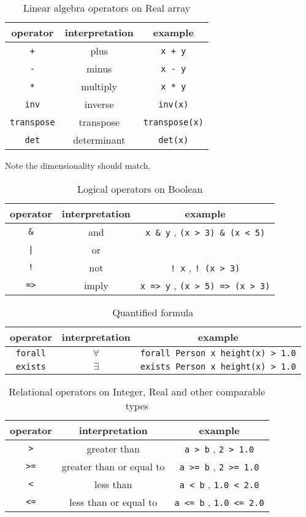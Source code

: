 \documentclass[12pt]{article}
\begin{document}
\begin{table}[H]
\centering
\caption{Linear algebra operators on Real array}
\begin{tabular}{ c c c }
\toprule 
operator & interpretation & example \\
\midrule
\verb|+| & plus & \verb|x + y| \\ 
\verb|-| & minus & \verb|x - y| \\ 
\verb|*| & multiply & \verb|x * y| \\
\verb|inv| & inverse & \verb|inv(x)| \\
\verb|transpose| & transpose & \verb|transpose(x)| \\
\verb|det| & determinant & \verb|det(x)| \\
\bottomrule
\end{tabular}

Note the dimensionality should match. 
\end{table}

\begin{table}[H]
\centering
\caption{Logical operators on Boolean}
\begin{tabular}{ c c c }
\toprule 
operator & interpretation & example \\
\midrule
\verb|&| & and & \verb|x & y| , \verb|(x > 3) & (x < 5)| \\ 
{\tt |} & or & \verb\x | y\ , \verb\(x > 5) | (x < 3)\ \\ 
{\tt !} & not & \verb|! x| , \verb|! (x > 3)| \\
{\tt =>} & imply & \verb|x => y| , \verb|(x > 5) => (x > 3)| \\
\bottomrule
\end{tabular}
\end{table}

\begin{table}[H]
\centering
\caption{Quantified formula}
\begin{tabular}{ c c c }
\toprule 
operator & interpretation & example \\
\midrule
{\tt forall} & $\forall$ & \verb|forall Person x height(x) > 1.0| \\ 
{\tt exists} & $\exists$ & \verb|exists Person x height(x) > 1.0|  \\ 
\bottomrule
\end{tabular}
\end{table}

\begin{table}[H]
\centering
\caption{Relational operators on Integer, Real and other comparable types}
\begin{tabular}{ c c c }
\toprule 
operator & interpretation & example \\
\midrule
{\tt >} & greater than & \verb|a > b| ,  \verb|2 > 1.0|\\ 
{\tt >=} & greater than or equal to & \verb|a >= b| ,  \verb|2 >= 1.0| \\ 
{\tt <} & less than & \verb|a < b| ,  \verb|1.0 < 2.0| \\
{\tt <=} & less than or equal to & \verb|a <= b| ,  \verb|1.0 <= 2.0|  \\
\bottomrule
\end{tabular}
\end{table}
\end{document}
